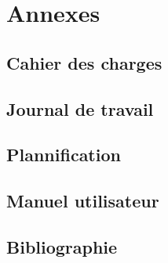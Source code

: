 \documentclass[a4paper,10pt,openany,oneside]{sphinxmanual}
\begin{document}
\chapter{Annexes}
\label{index:annexes}

\section{Cahier des charges}
\label{index:cahier-des-charges}

\section{Journal de travail}
\label{index:id13}

\section{Plannification}
\label{index:plannification}

\section{Manuel utilisateur}
\label{index:manuel-utilisateur}

\section{Bibliographie}
\label{index:bibliographie}


\renewcommand{\indexname}{Index}
\printindex
\end{document}
